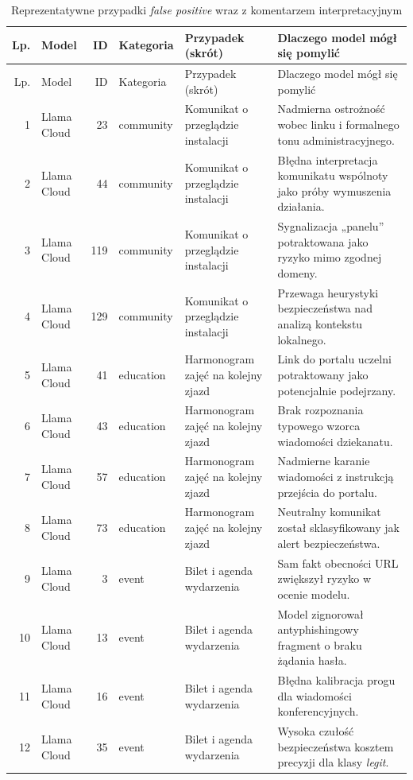 \documentclass[12pt,a4paper,openright]{report}
\begin{document}
\begin{center}
\scriptsize
\begin{longtable}{r l r l p{3.2cm} p{4.8cm}}
\caption{Reprezentatywne przypadki \textit{false positive} wraz z komentarzem interpretacyjnym} \label{tab:fp-analysis} \\
\toprule
Lp. & Model & ID & Kategoria & Przypadek (skrót) & Dlaczego model mógł się pomylić \\
\midrule
\endfirsthead
\toprule
Lp. & Model & ID & Kategoria & Przypadek (skrót) & Dlaczego model mógł się pomylić \\
\midrule
\endhead
1 & Llama Cloud & 23 & community & Komunikat o przeglądzie instalacji & Nadmierna ostrożność wobec linku i formalnego tonu administracyjnego. \\
2 & Llama Cloud & 44 & community & Komunikat o przeglądzie instalacji & Błędna interpretacja komunikatu wspólnoty jako próby wymuszenia działania. \\
3 & Llama Cloud & 119 & community & Komunikat o przeglądzie instalacji & Sygnalizacja „panelu” potraktowana jako ryzyko mimo zgodnej domeny. \\
4 & Llama Cloud & 129 & community & Komunikat o przeglądzie instalacji & Przewaga heurystyki bezpieczeństwa nad analizą kontekstu lokalnego. \\
5 & Llama Cloud & 41 & education & Harmonogram zajęć na kolejny zjazd & Link do portalu uczelni potraktowany jako potencjalnie podejrzany. \\
6 & Llama Cloud & 43 & education & Harmonogram zajęć na kolejny zjazd & Brak rozpoznania typowego wzorca wiadomości dziekanatu. \\
7 & Llama Cloud & 57 & education & Harmonogram zajęć na kolejny zjazd & Nadmierne karanie wiadomości z instrukcją przejścia do portalu. \\
8 & Llama Cloud & 73 & education & Harmonogram zajęć na kolejny zjazd & Neutralny komunikat został sklasyfikowany jak alert bezpieczeństwa. \\
9 & Llama Cloud & 3 & event & Bilet i agenda wydarzenia & Sam fakt obecności URL zwiększył ryzyko w ocenie modelu. \\
10 & Llama Cloud & 13 & event & Bilet i agenda wydarzenia & Model zignorował antyphishingowy fragment o braku żądania hasła. \\
11 & Llama Cloud & 16 & event & Bilet i agenda wydarzenia & Błędna kalibracja progu dla wiadomości konferencyjnych. \\
12 & Llama Cloud & 35 & event & Bilet i agenda wydarzenia & Wysoka czułość bezpieczeństwa kosztem precyzji dla klasy \textit{legit}. \\

\end{longtable}
\end{center}
\end{document}
